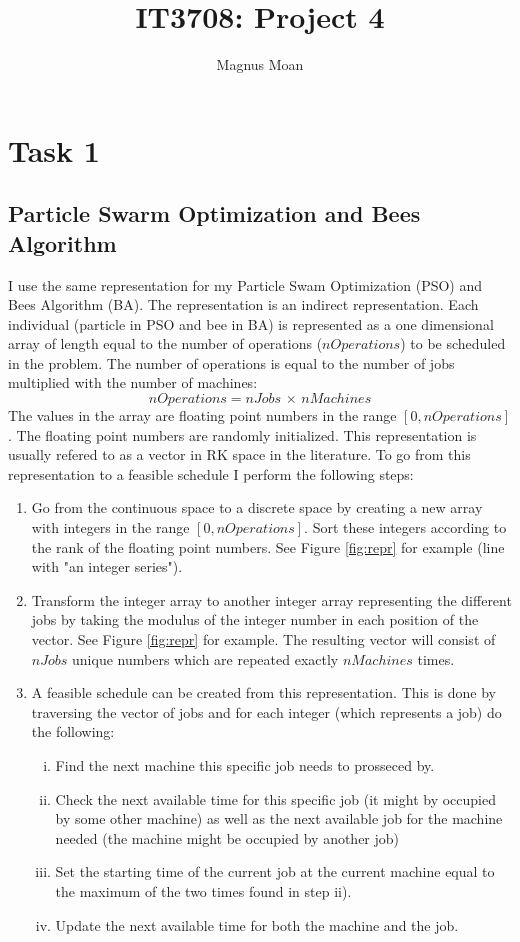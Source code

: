 \documentclass{article}
\author{Magnus Moan}
\title{IT3708: Project 4}
\begin{document}
\maketitle

\section*{Task 1}
\subsection*{Particle Swarm Optimization and Bees Algorithm}
I use the same representation for my Particle Swam Optimization (PSO) and Bees Algorithm (BA). The representation is an indirect representation. Each individual (particle in PSO and bee in BA) is represented as a one dimensional array of length equal
to the number of operations ($nOperations$) to be scheduled in the problem. The number of operations is equal to the number of jobs multiplied with the number of machines:
\begin{equation*}
  nOperations = nJobs\,\times\,nMachines
\end{equation*}
The values in the array are floating point numbers in the range $[0, nOperations]$. The floating point numbers are randomly initialized. This representation is usually refered to as a vector in RK space in the literature. To go from this representation to a feasible schedule I perform the following steps:
\begin{enumerate}
  \item Go from the continuous space to a discrete space by creating a new array with integers in the range $[0, nOperations]$. Sort these integers according to the rank of the floating point numbers. See Figure \ref{fig:repr} for example (line with "an integer series").
  \item Transform the integer array to another integer array representing the different jobs by taking the modulus of the integer number in each position of the vector. See Figure \ref{fig:repr} for example. The resulting vector will consist of $nJobs$ unique numbers which are
    repeated exactly $nMachines$ times.
  \item A feasible schedule can be created from this representation. This is done by traversing the vector of jobs and for each integer (which represents a job) do the following:
    \begin{enumerate}[i)]
      \item Find the next machine this specific job needs to prosseced by. 
      \item Check the next available time for this specific job (it might by occupied by some other machine) as well as the next available job for the machine needed (the machine might be occupied by another job)
      \item Set the starting time of the current job at the current machine equal to the maximum of the two times found in step ii).
      \item Update the next available time for both the machine and the job.
    \end{enumerate}
\end{enumerate}
\end{document}
